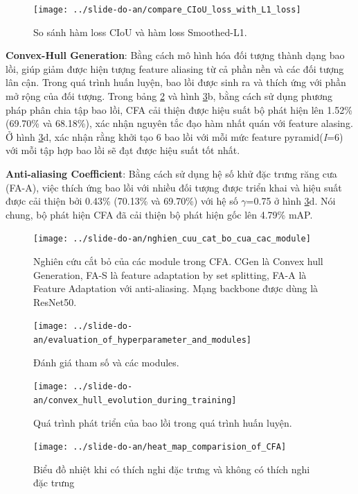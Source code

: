\documentclass[12pt,a4paper,openany,oneside]{report}
\begin{document}
\begin{figure}
	\centering
	\texttt{[image: ../slide-do-an/compare\_CIoU\_loss\_with\_L1\_loss]}
	\caption{So sánh hàm loss CIoU và hàm loss Smoothed-L1.}
	\label{comparecioulosswithl1loss}
\end{figure}
 
 
\textbf{Convex-Hull Generation}: Bằng cách mô hình hóa đối tượng thành dạng bao lồi, giúp giảm được hiện tượng feature aliasing từ cả phần nền và các đối tượng lân cận. Trong quá trình huấn luyện, bao lồi được sinh ra và thích ứng với phần mở rộng của đối tượng. Trong bảng \ref{fig:nghiencuucatbocuacacmodule} và hình \ref{fig:evaluationofhyperparameterandmodules}b, bằng cách sử dụng phương pháp phân chia tập bao lồi, CFA cải thiện được hiệu suất bộ phát hiện lên 1.52\% (69.70\% và 68.18\%), xác nhận nguyên tắc đạo hàm nhất quán với feature alasing. Ở hình \ref{fig:evaluationofhyperparameterandmodules}d, xác nhận rằng khởi tạo 6 bao lồi với mỗi mức feature pyramid(\textit{I}=6) với mỗi tập hợp bao lồi sẽ đạt được hiệu suất tốt nhất.

\textbf{Anti-aliasing Coefficient}: Bằng cách sử dụng hệ số khử đặc trưng răng cưa (FA-A), việc thích ứng bao lồi với nhiều đối tượng được triển khai và hiệu suất được cải thiện bởi 0.43\% (70.13\% và 69.70\%) với hệ số $\gamma$=0.75 ở hình \ref{fig:evaluationofhyperparameterandmodules}d. Nói chung, bộ phát hiện CFA đã cải thiện bộ phát hiện gốc lên 4.79\% mAP.


\begin{figure}
	\centering
	\texttt{[image: ../slide-do-an/nghien\_cuu\_cat\_bo\_cua\_cac\_module]}
	\caption{Nghiên cứu cắt bỏ của các module trong CFA. CGen là Convex hull Generation, FA-S là feature adaptation by set splitting, FA-A là Feature Adaptation với anti-aliasing. Mạng backbone được dùng là ResNet50.}
	\label{fig:nghiencuucatbocuacacmodule}
\end{figure}
\begin{figure}
	\centering
	\texttt{[image: ../slide-do-an/evaluation\_of\_hyperparameter\_and\_modules]}
	\caption{Đánh giá tham số và các modules. }
	\label{fig:evaluationofhyperparameterandmodules}
\end{figure}

\begin{figure}
	\centering
	\texttt{[image: ../slide-do-an/convex\_hull\_evolution\_during\_training]}
	\caption{Quá trình phát triển của bao lồi trong quá trình huấn luyện.}
	\label{convexhullevolutionduringtraining}
\end{figure}
\begin{figure}
	\centering
	\texttt{[image: ../slide-do-an/heat\_map\_comparision\_of\_CFA]}
	\caption{Biểu đồ nhiệt khi có thích nghi đặc trưng và không có thích nghi đặc trưng}
	\label{heatmapcomparisionofcfa}
\end{figure}
\end{document}
